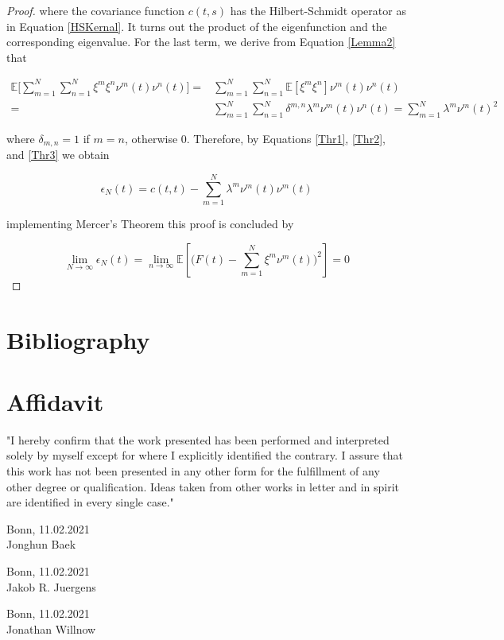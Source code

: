 \documentclass[11pt,twoside,a4paper]{article}
\begin{document}
\begin{proof}
		where the covariance function $c(t,s)$ has the Hilbert-Schmidt operator as in Equation \ref{HSKernal}. It turns out the product of the eigenfunction and the corresponding eigenvalue. For the last term, we derive from Equation \ref{Lemma2} that
		
		\begin{equation}\label{Thr3}
			\begin{split}
				\mathbb{E}\bigg[\sum_{m=1}^{N} \sum_{n=1}^{N} \xi^m \xi^n \nu^m(t) \nu^n(t)\bigg] = & \sum_{m=1}^{N} \sum_{n=1}^{N} \mathbb{E}[\xi^m \xi^n] \nu^m(t) \nu^n(t)\\
				= & \sum_{m=1}^{N} \sum_{n=1}^{N} \delta^{m,n} \lambda^m \nu^m(t) \nu^n(t) = 		\sum_{m=1}^{N} \lambda^m \nu^m(t)^{2}
			\end{split}	
		\end{equation}
	
		where $\delta_{m,n} = 1$ if $m=n$, otherwise 0. Therefore, by Equations \ref{Thr1}, \ref{Thr2}, and \ref{Thr3} we obtain
		
		\begin{equation}
			\epsilon_{N}(t) = c(t,t) - \sum_{m=1}^{N} \lambda^m \nu^m(t) \nu^m(t)
		\end{equation}
		
		implementing Mercer's Theorem this proof is concluded by
		
		\begin{equation}
			\lim\limits_{N \rightarrow \infty} \epsilon_{N}(t) = \lim\limits_{n \rightarrow \infty} \mathbb{E} \left[\bigg( F(t) - \sum_{m=1}^{N} \xi^m \nu^m(t)\bigg)^2 \right] = 0
		\end{equation}
	
	\end{proof}

	\newpage
	
	\section{Bibliography}
	\printbibliography[heading=none]	
	
	\section*{Affidavit}
	
	\vspace{2cm}
	"I hereby confirm that the work presented has been performed and
	interpreted solely by myself except for where I explicitly identified the
	contrary. I assure that this work has not been presented in any other
	form for the fulfillment of any other degree or qualification. Ideas
	taken from other works in letter and in spirit are identified in every
	single case."
	
	\vspace{2cm}
	Bonn, 11.02.2021 \hrulefill \\
	\hspace*{0mm}Jonghun Baek
	
	\vspace{2cm}
	Bonn, 11.02.2021 \hrulefill \\
	\hspace*{0mm}Jakob R. Juergens
	
	\vspace{2cm}
	Bonn, 11.02.2021 \hrulefill \\
	\hspace*{0mm}Jonathan Willnow
	
	
\end{document}
